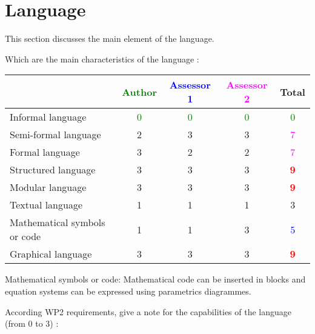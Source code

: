 \section{Language}
This section discusses the main element of the language.

Which are the main characteristics of the language :

\begin{tabular}{|l | c | c | c | c|}
\hline
& \textcolor{green}{Author} & \textcolor{blue}{Assessor 1} & \textcolor{magenta}{Assessor 2} & Total \\
\hline 
Informal language & \textcolor{green}{0} & \textcolor{green}{0} & \textcolor{green}{0} & \textcolor{green}{0} \\
\hline 
Semi-formal language & 2     & 3     & 3     & \textcolor{magenta}{7} \\
\hline
Formal language & 3     & 2     & 2     & \textcolor{magenta}{7} \\
\hline
Structured language &3 & 3     & 3     & \textcolor{red}{\textbf{9}} \\
\hline
Modular language &3 & 3     & 3     & \textcolor{red}{\textbf{9}} \\
\hline
Textual language & 1     & 1     & 1     & 3     \\
\hline
Mathematical symbols or code & 1     & 1     & 3     & \textcolor{blue}{5} \\
\hline
Graphical language & 3     & 3     & 3     & \textcolor{red}{\textbf{9}} \\
\hline
\end{tabular}
\begin{assessor2}
Mathematical symbols or code: Mathematical code can be inserted in blocks and equation systems can be expressed using parametrics diagrammes.
\end{assessor2}



According WP2 requirements, give a note for the capabilities of the language (from 0 to 3) :

